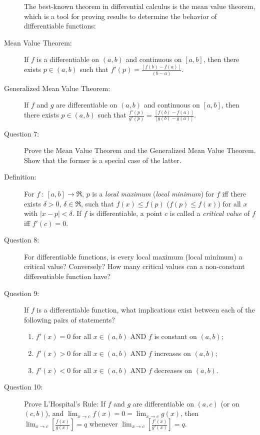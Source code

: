 \documentclass{article}
\begin{document}
\begin{description}
  \item[] The best-known theorem in differential calculus is the mean value theorem, which is a tool for proving results to determine the behavior of differentiable functions:

  \item[Mean Value Theorem:] If $f$ is a differentiable on $(a,b)$ and continuous on $[a,b]$, then there exists $p \in (a,b)$ such that $f'(p) = \frac{[f(b) - f(a)]}{(b - a)}$.

  \item[Generalized Mean Value Theorem:] If $f$ and $g$ are differentiable on $(a,b)$ and continuous on $[a,b]$, then there exists $p \in (a,b)$ such that $\frac{f'(p)}{g'(p)} = \frac{[f(b) - f(a)]}{[g(b) - g(a)]}$.

  \item[Question 7:] Prove the Mean Value Theorem and the Generalized Mean Value Theorem. Show that the former is a special case of the latter.

  \item[Definition:] For $f\ :\ [a,b] \to \Re$, $p$ is a \emph{local maximum} (\emph{local minimum}) for $f$ iff there exists $\delta > 0$, $\delta \in \Re$, such that $f(x) \leq f(p)$ ($f(p) \leq f(x)$) for all $x$ with $|x-p| < \delta$. If $f$ is differentiable, a point $c$ is called a \emph{critical value} of $f$ iff $f'(c) = 0$.

  \item[Question 8:] For differentiable functions, is every local maximum (local minimum) a critical value? Conversely? How many critical values can a non-constant differentiable function have?

  \item[Question 9:] If $f$ is a differentiable function, what implications exist between each of the following pairs of statements?
    \begin{enumerate}[\hspace{1cm}(1)]
      \item $f'(x) = 0$ for all $x \in (a,b)$ AND $f$ is constant on $(a,b)$;
      \item $f'(x) > 0$ for all $x \in (a,b)$ AND $f$ increases on $(a,b)$;
      \item $f'(x) < 0$ for all $x \in (a,b)$ AND $f$ decreases on $(a,b)$.
    \end{enumerate}

  \item[Question 10:] Prove L'Hospital's Rule: If $f$ and $g$ are differentiable on $(a,c)$ (or on $(c,b)$), and $\displaystyle \lim_{x \to c} f(x) = 0 = \lim_{x \to c} g(x)$, then $\displaystyle \lim_{x \to c} \left[ \frac{f(x)}{g(x)} \right] = q$ whenever $\displaystyle \lim_{x \to c} \left[ \frac{f'(x)}{g'(x)} \right] = q$.


\end{description}
\end{document}
